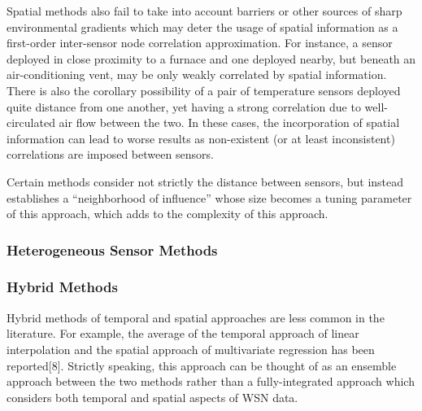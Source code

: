 Spatial methods also fail to take into account barriers or other sources of sharp environmental gradients which may deter the usage of spatial information as a first-order inter-sensor node correlation approximation.
For instance, a sensor deployed in close proximity to a furnace and one deployed nearby, but beneath an air-conditioning vent, may be only weakly correlated by spatial information.
There is also the corollary possibility of a pair of temperature sensors deployed quite distance from one another, yet having a strong correlation due to well-circulated air flow between the two.
In these cases, the incorporation of spatial information can lead to worse results as non-existent (or at least inconsistent) correlations are imposed between sensors.



Certain methods consider not strictly the distance between sensors, but instead establishes a ``neighborhood of influence'' whose size becomes a tuning parameter of this approach, which adds to the complexity of this approach.

\subsubsection{Heterogeneous Sensor Methods}

\subsubsection{Hybrid Methods}
Hybrid methods of temporal and spatial approaches are less common in the literature.
For example, the average of the temporal approach of linear interpolation and the spatial approach of multivariate regression has been reported[8].
Strictly speaking, this approach can be thought of as an ensemble approach between the two methods rather than a fully-integrated approach which considers both temporal and spatial aspects of WSN data.


